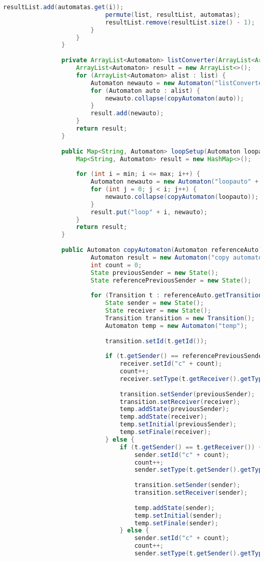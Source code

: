 \begin{lstlisting}[language=java, caption={példa unit teszteset.},captionpos=b]
							resultList.add(automatas.get(i));
							permute(list, resultList, automatas);
							resultList.remove(resultList.size() - 1);
						}
					}
				}
			
				private ArrayList<Automaton> listConverter(ArrayList<ArrayList<Automaton>> list) {
					ArrayList<Automaton> result = new ArrayList<>();
					for (ArrayList<Automaton> alist : list) {
						Automaton newauto = new Automaton("listConverter");
						for (Automaton auto : alist) {
							newauto.collapse(copyAutomaton(auto));
						}
						result.add(newauto);
					}
					return result;
				}
				
				public Map<String, Automaton> loopSetup(Automaton loopauto, int min, int max) {
					Map<String, Automaton> result = new HashMap<>();
					
					for (int i = min; i <= max; i++) {
						Automaton newauto = new Automaton("loopauto" + i);
						for (int j = 0; j < i; j++) {
							newauto.collapse(copyAutomaton(loopauto));
						}
						result.put("loop" + i, newauto);
					}
					return result;
				}
				
				public Automaton copyAutomaton(Automaton referenceAuto) {
						Automaton result = new Automaton("copy automaton");
						int count = 0;
						State previousSender = new State();
						State referencePreviousSender = new State();
				
						for (Transition t : referenceAuto.getTransitions()) {
							State sender = new State();
							State receiver = new State();
							Transition transition = new Transition();
							Automaton temp = new Automaton("temp");
				
							transition.setId(t.getId());
				
							if (t.getSender() == referencePreviousSender) {
								receiver.setId("c" + count);
								count++;
								receiver.setType(t.getReceiver().getType());
				
								transition.setSender(previousSender);
								transition.setReceiver(receiver);
								temp.addState(previousSender);
								temp.addState(receiver);
								temp.setInitial(previousSender);
								temp.setFinale(receiver);
							} else {
								if (t.getSender() == t.getReceiver()) {
									sender.setId("c" + count);
									count++;
									sender.setType(t.getSender().getType());
				
									transition.setSender(sender);
									transition.setReceiver(sender);
				
									temp.addState(sender);
									temp.setInitial(sender);
									temp.setFinale(sender);
								} else {
									sender.setId("c" + count);
									count++;
									sender.setType(t.getSender().getType());
				

\end{lstlisting}
